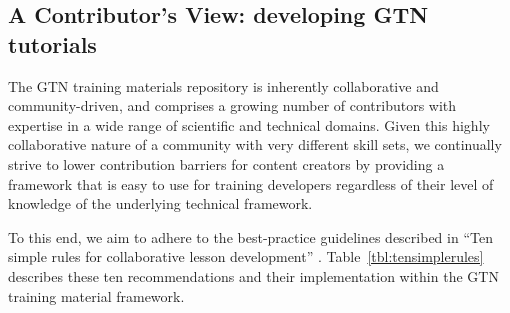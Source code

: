 \documentclass[10pt,letterpaper]{article}
\begin{document}
\subsection*{A Contributor's View: developing GTN tutorials}

The GTN training materials repository is inherently collaborative and community-driven, and comprises a growing number of contributors with expertise in a wide range of scientific and technical domains. Given this highly collaborative nature of a community with very different skill sets, we continually strive to lower contribution barriers for content creators by providing a framework that is easy to use for training developers regardless of their level of knowledge of the underlying technical framework.

To this end, we aim to adhere to the best-practice guidelines described in  “Ten simple rules for collaborative lesson development” \cite{Devenyi_2018}.
Table~\ref{tbl:tensimplerules} describes these ten recommendations and their implementation within the GTN training material framework.
\end{document}
